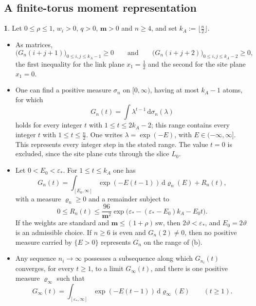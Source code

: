 \documentclass[11pt]{amsart}
\newcommand{\namedhead}{}
\theoremstyle{definition}
\newtheorem*{namedinner}{\namedhead}
\newenvironment{named}[1]{\renewcommand{\namedhead}{#1}\begin{namedinner}}{\end{namedinner}}
\begin{document}
\subsection{A finite-torus moment representation}
\begin{named}{Proposition 5.12}
Let $0\le\rho\le1$, $w_i>0$, $q>0$, $\mathbf m>0$ and $n\ge4$, and set $k_A:=\lfloor\frac n2\rfloor$.
\begin{itemize}
\item[(a)] As matrices,
\begin{equation*}
\bigl(G_n(i+j+1)\bigr)_{0\le i,j\le k_A-1}\ge0\qquad\text{and}\qquad\bigl(G_n(i+j+2)\bigr)_{0\le i,j\le k_A-2}\ge0,
\end{equation*}
the first inequality for the link plane $x_1=\frac12$ and the second for the site plane $x_1=0$.
\item[(b)] One can find a positive measure $\sigma_n$ on $[0,\infty)$, having at most $k_A-1$ atoms, for which
\begin{equation*}
G_n(t)=\int\lambda^{t-1}\,\mathrm d\sigma_n(\lambda)
\end{equation*}
holds for every integer $t$ with $1\le t\le2k_A-2$; this range contains every integer $t$ with $1\le t\le\frac n2$.
One writes $\lambda=\exp(-E)$, with $E\in(-\infty,\infty]$.
This represents every integer step in the stated range. The value $t=0$ is excluded, since the site plane cuts through the slice $L_0$.
\item[(c)] Let $0<E_0<\varepsilon_*$.
For $1\le t\le k_A$ one has
\begin{equation*}
G_n(t)=\int_{[E_0,\infty]}\exp(-E(t-1))\,\mathrm d\varrho_n(E)+R_n(t),
\end{equation*}
with a measure $\varrho_n\ge0$ and a remainder subject to
\begin{equation*}
0\le R_n(t)\le\frac{96}{\mathbf m^2}\exp\bigl(\varepsilon_*-(\varepsilon_*-E_0)k_A-E_0t\bigr).
\end{equation*}
If the weights are standard and $\mathbf m\le(1+\rho)\,\mathrm{sw}$, then $2\vartheta<\varepsilon_*$, and $E_0=2\vartheta$ is an admissible choice.
If $n\ge6$ is even and $G_n(2)\ne0$, then no positive measure carried by $\{E>0\}$ represents $G_n$ on the range of (b).
\item[(d)] Any sequence $n_i\to\infty$ possesses a subsequence along which $G_{n_i}(t)$ converges, for every $t\ge1$, to a limit $G_\infty(t)$, and there is one positive measure $\varrho_\infty$ such that
\begin{equation*}
G_\infty(t)=\int_{[\varepsilon_*,\infty]}\exp(-E(t-1))\,\mathrm d\varrho_\infty(E)\qquad(t\ge1).
\end{equation*}
\end{itemize}
\end{named}
\end{document}
